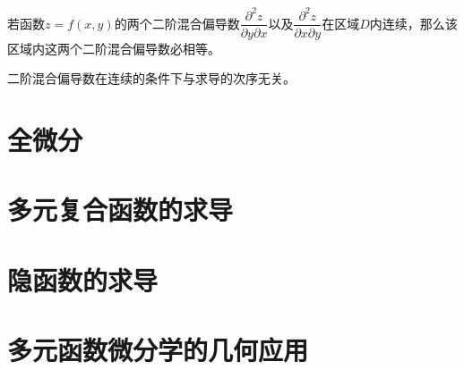 \documentclass[12pt,a4paper]{article}
\begin{document}
\begin{tcolorbox}[colback=green!15,colframe=green!40!black,title= 定理]
若函数$z = f(x, y)$的两个二阶混合偏导数$\dfrac{\partial^2 z}{\partial y \partial x}$以及$\dfrac{\partial^2 z}{\partial x \partial y}$在区域$D$内连续，那么该区域内这两个二阶混合偏导数必相等。  
\end{tcolorbox}
二阶混合偏导数在连续的条件下与求导的次序无关。























\section{全微分}

















\section{多元复合函数的求导}












\section{隐函数的求导}










\section{多元函数微分学的几何应用}
\end{document}
